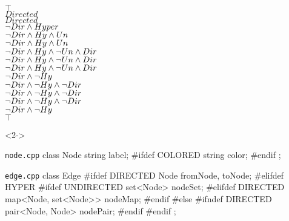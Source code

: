 \begin{frame}[fragile]{\myframetitle}
\begin{mycolumns}[t,columns=4,widths={31,20,20,29},animation=none]
{{\begin{flushright}
				{\color{black}$\top$}\\
				{\color{black}$Directed$}\\
				{\color{black}$Directed$}\\
				{\color{black}$\neg Dir \wedge Hyper$}\\
				{\color{black}$\neg Dir \wedge Hy \wedge Un$}\\
				{\color{black}$\neg Dir \wedge Hy \wedge Un$}\\
				{\color{black}$\neg Dir \wedge Hy \wedge \neg Un \wedge Dir$}\\
				{\color{black}$\neg Dir \wedge Hy \wedge \neg Un \wedge Dir$}\\
				{\color{black}$\neg Dir \wedge Hy \wedge \neg Un \wedge Dir$}\\
				{\color{black}$\neg Dir \wedge \neg Hy$}\\
				{\color{black}$\neg Dir \wedge \neg Hy \wedge \neg Dir$}\\
				{\color{black}$\neg Dir \wedge \neg Hy \wedge \neg Dir$}\\
				{\color{black}$\neg Dir \wedge \neg Hy \wedge \neg Dir$}\\
				{\color{black}$\neg Dir \wedge \neg Hy$}\\
				{\color{black}$\top$}
			\end{flushright}
		}}
	\mynextcolumn
		\begin{uncoverenv}<2->
			\begin{cpptight}[basicstyle=\tiny]{\texttt{node.cpp}}
class Node {
	string label;
#ifdef COLORED
	string color;
#endif
};
			\end{cpptight}
			\begin{cpptight}[basicstyle=\tiny]{\texttt{edge.cpp}}
class Edge {
#ifdef DIRECTED
	Node fromNode, toNode;
#elifdef HYPER
#ifdef UNDIRECTED
	set<Node> nodeSet;
#elifdef DIRECTED
	map<Node, set<Node>> nodeMap;
#endif
#else
#ifndef DIRECTED
	pair<Node, Node> nodePair;
#endif
#endif
};
			\end{cpptight}
		\end{uncoverenv}
	\end{mycolumns}
\end{frame}

